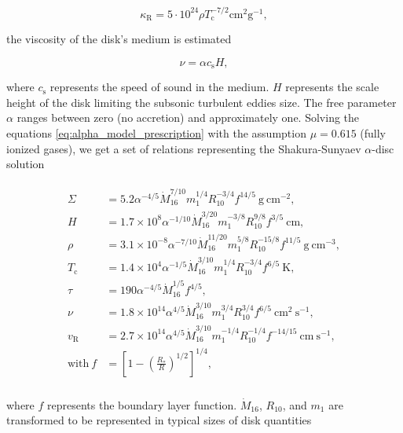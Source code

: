     \begin{equation}
        \kappa_{\mathrm{R}} = 5 \cdot 10^{24} \rho T_{\mathrm{c}}^{-7/2} \si{\cm^2 \gram^{-1}},
    \end{equation}


    the viscosity of the disk's medium is estimated

    \begin{equation}
        \nu = \alpha c_{\mathrm{s}} H,
    \end{equation}

    where $c_{\mathrm{s}}$ represents the speed of sound in the medium. $H$ represents the scale height of the disk limiting the subsonic turbulent eddies size. The free parameter $\alpha$ ranges between zero (no accretion) and approximately one. Solving the equations \eqref{eq:alpha_model_prescription} with the assumption $\mu = 0.615$ (fully ionized gases), we get a set of relations representing the Shakura-Sunyaev $\alpha$-disc solution \cite{acpow}  

    \begin{align}
    \begin{split}
    \Sigma &= 5.2 \alpha^{-4/5} \dot{M}^{7/10}_{16} m^{1/4}_1 R^{-3/4}_{10} f^{14/5}\ \mathrm{g\ cm^{-2}}, \\
    H &= 1.7 \times 10^8 \alpha^{-1/10} \dot{M}^{3/20}_{16} m^{-3/8}_1 R^{9/8}_{10} f^{3/5}\ \mathrm{cm}, \\
    \rho &= 3.1 \times 10^{-8} \alpha^{-7/10} \dot{M}^{11/20}_{16} m^{5/8}_1 R^{-15/8}_{10} f^{11/5}\ \mathrm{g\ cm^{-3}}, \\
    T_{\mathrm{c}} &= 1.4 \times 10^4 \alpha^{-1/5} \dot{M}^{3/10}_{16} m^{1/4}_1 R^{-3/4}_{10} f^{6/5}\ \mathrm{K}, \\
    \tau &= 190 \alpha^{-4/5} \dot{M}^{1/5}_{16} f^{4/5}, \\
    \nu	&= 1.8 \times 10^{14} \alpha^{4/5} \dot{M}^{3/10}_{16} m^{3/4}_1 R^{3/4}_{10} f^{6/5}\ \mathrm{cm^2\ s^{-1}},  \\
    v_{\mathrm{R}}	&= 2.7 \times 10^{14} \alpha^{4/5} \dot{M}^{3/10}_{16} m^{-1/4}_1 R^{-1/4}_{10} f^{-14/15}\ \mathrm{cm\ s^{-1}},  \\
    \mathrm{with}\ f &= \left[ 1 - \left( \frac{R_*}{R} \right)^{1/2} \right]^{1/4}, \\
    \end{split}
    \label{eq:alpha_model_solution}
    \end{align}

    where $f$ represents the boundary layer function. $\dot{M}_{16}$, $R_{10}$, and $m_1$ are transformed to be represented in typical sizes of disk quantities

